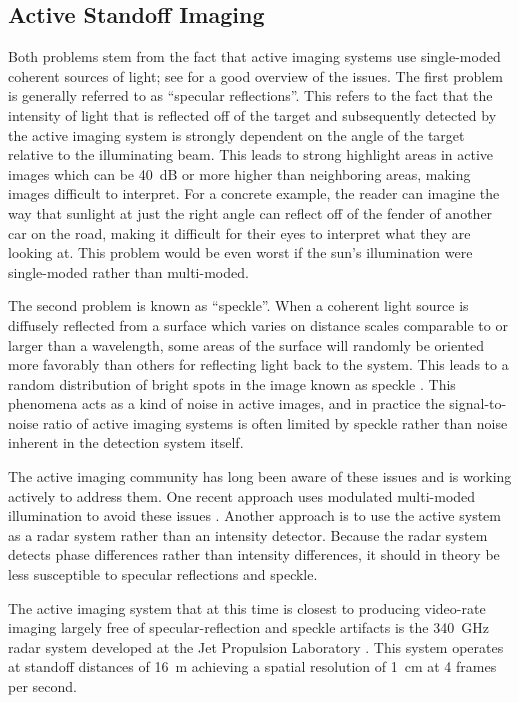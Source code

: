 \subsection{Active Standoff Imaging}

Both problems stem from the fact that active imaging systems use single-moded coherent sources of light; see \cite{petkie_active_2008} for a good overview of the issues.
The first problem is generally referred to as ``specular reflections''.
This refers to the fact that the intensity of light that is reflected off of the target and subsequently detected by the active imaging system is strongly dependent on the angle of the target relative to the illuminating beam.
This leads to strong highlight areas in active images which can be \SI{40}{\dB} or more higher than neighboring areas, making images difficult to interpret.
For a concrete example, the reader can imagine the way that sunlight at just the right angle can reflect off of the fender of another car on the road, making it difficult for their eyes to interpret what they are looking at.
This problem would be even worst if the sun's illumination were single-moded rather than multi-moded.

The second problem is known as ``speckle''.
When a coherent light source is diffusely reflected from a surface which varies on distance scales comparable to or larger than a wavelength, some areas of the surface will randomly be oriented more favorably than others for reflecting light back to the system.
This leads to a random distribution of bright spots in the image known as speckle \cite{goodman_fundamental_1976}.
This phenomena acts as a kind of noise in active images, and in practice the signal-to-noise ratio of active imaging systems is often limited by speckle rather than noise inherent in the detection system itself.

The active imaging community has long been aware of these issues and is working actively to address them.
One recent approach uses modulated multi-moded illumination to avoid these issues \cite{petkie_multimode_2012,patrick_elimination_2012}.
Another approach is to use the active system as a radar system rather than an intensity detector.
Because the radar system detects phase differences rather than intensity differences, it should in theory be less susceptible to specular reflections and speckle. %

The active imaging system that at this time is closest to producing video-rate imaging largely free of specular-reflection and speckle artifacts is the \SI{340}{\GHz} radar system developed at the Jet Propulsion Laboratory \cite{cooper_thz_2011}.
This system operates at standoff distances of \SI{16}{\m} achieving a spatial resolution of \SI{1}{\cm} at 4 frames per second.

